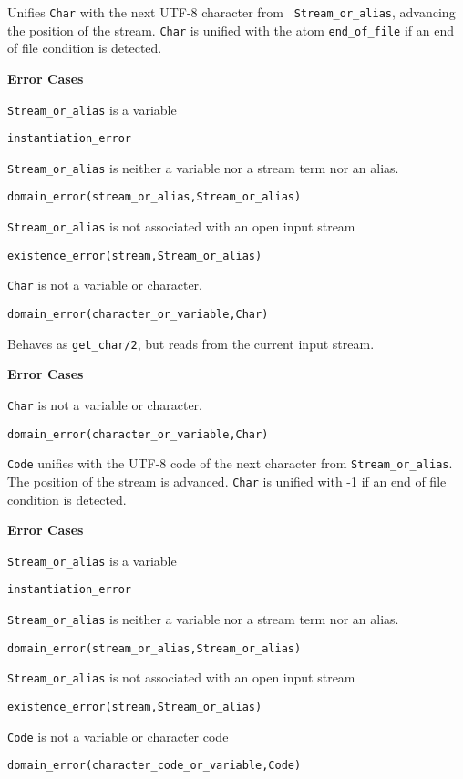 \begin{description}

 Unifies
        {\tt Char} with the next UTF-8 character from {\tt
          Stream\_or\_alias}, advancing the position of the stream.
        {\tt Char} is unified with the atom {\tt end\_of\_file} if an
        end of file condition is detected.

{\bf Error Cases}
\bi
\item 	{\tt Stream\_or\_alias} is a variable
\bi
\item {\tt instantiation\_error}
\ei
\item 	{\tt Stream\_or\_alias} is neither a variable nor a stream term nor an alias.
\bi
\item 	{\tt domain\_error(stream\_or\_alias,Stream\_or\_alias)}
\ei
\item 	{\tt Stream\_or\_alias} is not associated with an open input stream
\bi
\item 	{\tt existence\_error(stream,Stream\_or\_alias)}
\ei
\item 	{\tt Char} is not a variable or character.
\bi
\item 	{\tt domain\_error(character\_or\_variable,Char)}
\ei
\ei

%
Behaves as {\tt get\_char/2}, but reads from the current input stream.

{\bf Error Cases}
\bi
\item 	{\tt Char} is not a variable or character.
\bi
\item 	{\tt domain\_error(character\_or\_variable,Char)}
\ei
\ei

%
   {\tt Code} unifies with the UTF-8 code of the next character from
   {\tt Stream\_or\_alias}.  The position of the stream is advanced.
   {\tt Char} is unified with -1 if an end of file condition is
   detected.

{\bf Error Cases}
\bi
\item 	{\tt Stream\_or\_alias} is a variable
\bi
\item {\tt instantiation\_error}
\ei
\item 	{\tt Stream\_or\_alias} is neither a variable nor a stream term nor an alias.
\bi
\item 	{\tt domain\_error(stream\_or\_alias,Stream\_or\_alias)}
\ei
\item 	{\tt Stream\_or\_alias} is not associated with an open input stream
\bi
\item 	{\tt existence\_error(stream,Stream\_or\_alias)}
\ei
\item 	{\tt Code} is not a variable or character code
\bi
\item 	{\tt domain\_error(character\_code\_or\_variable,Code)}
\ei
\ei


\end{description}

